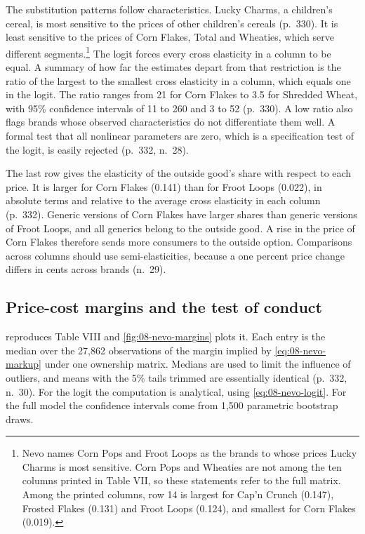 The substitution patterns follow characteristics. Lucky Charms, a children's cereal, is most sensitive to the
prices of other children's cereals (p.~330). It is least sensitive to the prices of Corn Flakes, Total and Wheaties, which
serve different segments.\footnote{Nevo names Corn Pops and Froot Loops as the brands to whose prices Lucky
Charms is most sensitive. Corn Pops and Wheaties are not among the ten columns printed in Table VII, so these
statements refer to the full matrix. Among the printed columns, row 14 is largest for Cap'n Crunch (0.147),
Frosted Flakes (0.131) and Froot Loops (0.124), and smallest for Corn Flakes (0.019).} The logit forces every
cross elasticity in a column to be equal. A summary of how far the estimates depart from that restriction is
the ratio of the largest to the smallest cross elasticity in a column, which equals one in the logit. The ratio
ranges from 21 for Corn Flakes to 3.5 for Shredded Wheat, with 95\% confidence intervals of 11 to 260 and 3
to 52 (p.~330). A low ratio also flags brands whose observed characteristics do not differentiate them well. A
formal test that all nonlinear parameters are zero, which is a specification test of the logit, is easily
rejected (p.~332, n.~28).

The last row gives the elasticity of the outside good's share with respect to each price. It is larger for
Corn Flakes (0.141) than for Froot Loops (0.022), in absolute terms and relative to the average cross elasticity
in each column (p.~332). Generic versions of Corn Flakes have larger shares than generic versions of Froot
Loops, and all generics belong to the outside good. A rise in the price of Corn Flakes therefore sends more
consumers to the outside option. Comparisons across columns should use semi-elasticities, because a one
percent price change differs in cents across brands (n.~29).

\subsection{Price-cost margins and the test of conduct}\label{sec:08-nevo01-margins}

  reproduces Table VIII and \cref{fig:08-nevo-margins}
plots it. Each entry is the median over the 27,862 observations of the margin implied by
\cref{eq:08-nevo-markup} under one ownership matrix. Medians are used to limit the influence of outliers, and
means with the 5\% tails trimmed are essentially identical (p.~332, n.~30). For the logit the computation is
analytical, using \eqref{eq:08-nevo-logit}. For the full model the confidence intervals come from 1,500
parametric bootstrap draws.

